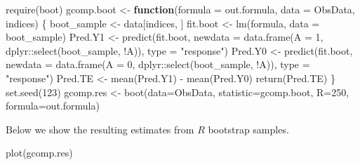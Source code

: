 \documentclass[
]{book}
\newenvironment{Shaded}{\begin{snugshade}}{\end{snugshade}}
\newcommand{\AttributeTok}[1]{\textcolor[rgb]{0.77,0.63,0.00}{#1}}
\newcommand{\ControlFlowTok}[1]{\textcolor[rgb]{0.13,0.29,0.53}{\textbf{#1}}}
\newcommand{\DecValTok}[1]{\textcolor[rgb]{0.00,0.00,0.81}{#1}}
\newcommand{\FunctionTok}[1]{\textcolor[rgb]{0.00,0.00,0.00}{#1}}
\newcommand{\NormalTok}[1]{#1}
\newcommand{\OtherTok}[1]{\textcolor[rgb]{0.56,0.35,0.01}{#1}}
\newcommand{\SpecialCharTok}[1]{\textcolor[rgb]{0.00,0.00,0.00}{#1}}
\newcommand{\StringTok}[1]{\textcolor[rgb]{0.31,0.60,0.02}{#1}}
\begin{document}
\begin{Shaded}
\begin{Highlighting}[]
\FunctionTok{require}\NormalTok{(boot)}
\NormalTok{gcomp.boot }\OtherTok{\textless{}{-}} \ControlFlowTok{function}\NormalTok{(}\AttributeTok{formula =}\NormalTok{ out.formula, }\AttributeTok{data =}\NormalTok{ ObsData, indices) \{}
\NormalTok{  boot\_sample }\OtherTok{\textless{}{-}}\NormalTok{ data[indices, ]}
\NormalTok{  fit.boot }\OtherTok{\textless{}{-}} \FunctionTok{lm}\NormalTok{(formula, }\AttributeTok{data =}\NormalTok{ boot\_sample)}
\NormalTok{  Pred.Y1 }\OtherTok{\textless{}{-}} \FunctionTok{predict}\NormalTok{(fit.boot, }
                     \AttributeTok{newdata =} \FunctionTok{data.frame}\NormalTok{(}\AttributeTok{A =} \DecValTok{1}\NormalTok{, }
\NormalTok{                                          dplyr}\SpecialCharTok{::}\FunctionTok{select}\NormalTok{(boot\_sample, }\SpecialCharTok{!}\NormalTok{A)), }
                           \AttributeTok{type =} \StringTok{"response"}\NormalTok{)}
\NormalTok{  Pred.Y0 }\OtherTok{\textless{}{-}} \FunctionTok{predict}\NormalTok{(fit.boot, }
                     \AttributeTok{newdata =} \FunctionTok{data.frame}\NormalTok{(}\AttributeTok{A =} \DecValTok{0}\NormalTok{, }
\NormalTok{                                          dplyr}\SpecialCharTok{::}\FunctionTok{select}\NormalTok{(boot\_sample, }\SpecialCharTok{!}\NormalTok{A)), }
                           \AttributeTok{type =} \StringTok{"response"}\NormalTok{)}
\NormalTok{  Pred.TE }\OtherTok{\textless{}{-}} \FunctionTok{mean}\NormalTok{(Pred.Y1) }\SpecialCharTok{{-}} \FunctionTok{mean}\NormalTok{(Pred.Y0)}
  \FunctionTok{return}\NormalTok{(Pred.TE)}
\NormalTok{\}}
\FunctionTok{set.seed}\NormalTok{(}\DecValTok{123}\NormalTok{)}
\NormalTok{gcomp.res }\OtherTok{\textless{}{-}} \FunctionTok{boot}\NormalTok{(}\AttributeTok{data=}\NormalTok{ObsData, }
                  \AttributeTok{statistic=}\NormalTok{gcomp.boot,}
                  \AttributeTok{R=}\DecValTok{250}\NormalTok{, }
                  \AttributeTok{formula=}\NormalTok{out.formula)}
\end{Highlighting}
\end{Shaded}

Below we show the resulting estimates from \(R\) bootstrap samples.

\begin{Shaded}
\begin{Highlighting}[]
\FunctionTok{plot}\NormalTok{(gcomp.res) }
\end{Highlighting}
\end{Shaded}
\end{document}
